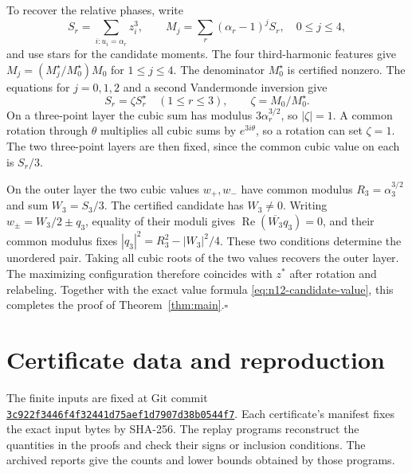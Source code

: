 \documentclass[11pt,letterpaper]{article}
\theoremstyle{remark}
\begin{document}
To recover the relative phases, write
\[
 S_r=\sum_{i:u_i=\alpha_r}z_i^3,\qquad
 M_j=\sum_r(\alpha_r-1)^j S_r,\quad 0\le j\le4,
\]
and use stars for the candidate moments. The four third-harmonic
features give \(M_j=(M_j^\star/M_0^\star)M_0\) for \(1\le j\le4\).
The denominator \(M_0^\star\) is certified nonzero. The
equations for \(j=0,1,2\) and a second Vandermonde inversion give
\[
 S_r=\zeta S_r^\star\quad(1\le r\le3),
 \qquad \zeta=M_0/M_0^\star.
\]
On a three-point layer the cubic sum has modulus
\(3\alpha_r^{3/2}\), so \(|\zeta|=1\). A common rotation
through \(\theta\) multiplies all cubic sums by \(e^{3i\theta}\),
so a rotation can set \(\zeta=1\). The two three-point layers are then
fixed, since the common cubic value on each is \(S_r/3\).

On the outer layer the two cubic values \(w_+,w_-\) have
common modulus \(R_3=\alpha_3^{3/2}\) and sum \(W_3=S_3/3\).
The certified candidate has \(W_3\ne0\). Writing
\(w_\pm=W_3/2\pm q_3\), equality of their moduli gives
\(\operatorname{Re}(\overline{W_3}q_3)=0\), and their common
modulus fixes \(|q_3|^2=R_3^2-|W_3|^2/4\). These two conditions
determine the unordered pair. Taking all cubic roots of the
two values recovers the outer layer. The maximizing configuration
therefore coincides with \(z^*\) after rotation and relabeling.
Together with the exact value formula \eqref{eq:n12-candidate-value},
this completes the proof of Theorem~\ref{thm:main}.\hfill\(\square\)

\section{Certificate data and reproduction}
\label{sec:reproduction}

The finite inputs are fixed at Git commit
\href{https://github.com/harrykane8816627373-cell/mordell-research/commit/3c922f3446f4f32441d75aef1d7907d38b0544f7}
{\texttt{3c922f3446f4f32441d75aef1d7907d38b0544f7}}.
Each certificate's manifest fixes the exact input bytes by SHA-256.
The replay programs reconstruct the quantities in the proofs and
check their signs or inclusion conditions. The archived reports give
the counts and lower bounds obtained by those programs.
\end{document}
